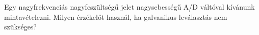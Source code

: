 \begin{example}

Egy nagyfrekvenciás nagyfeszültségű jelet nagysebességű A/D váltóval kívánunk mintavételezni. Milyen érzékelőt használ, ha galvanikus leválasztás nem szükséges?

\tcbline
\vspace{1mm}

\solution

\end{example}